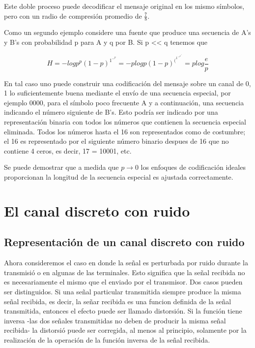 Este doble proceso puede decodificar el mensaje original en los mismo s\'{i}mbolos, pero con un radio de compresi\'{o}n promedio de $\frac{7}{8}$.

Como un segundo ejemplo considere una fuente que produce una secuencia de A's y B's con probabilidad p para A y q por B. Si p << q tenemos que

\begin{equation}
H = - log p^p (1 - p)^1^-^p
= -p log p(1-p)^(^1^-^p^)^/^p
= p log \frac{e}{p}
\end{equation}

En tal caso uno puede construir una codificaci\'{o}n del mensaje sobre un canal de 0, 1 lo suficientemente buena mediante el env\'{i}o de una secuencia especial, por ejemplo 0000, para el s\'{i}mbolo poco frecuente A y a continuaci\'{o}n, una secuencia indicando el n\'{u}mero siguiente de B's. Esto podr\'{i}a ser indicado por una representaci\'{o}n binaria con todos los n\'{u}meros que contienen la secuencia especial eliminada. Todos los n\'{u}meros hasta el 16 son representados como de costumbre; el 16 es representado por el siguiente n\'{u}mero binario despues de 16 que no contiene 4 ceros, es decir, 17  = 10001, etc.

Se puede demostrar que a medida que $p\rightarrow{0}$ los enfoques de codificaci\'{o}n ideales proporcionan la longitud de la secuencia especial es ajustada correctamente.

\part{El canal discreto con ruido}
\label{part:2}

\chapter{Representaci\'{o}n de un canal discreto con ruido}
\label{sec:11}

Ahora consideremos el caso en donde la señal es perturbada por ruido durante la transmisi\'{o} o en algunas de las terminales. Esto significa que la señal recibida no es necesariamente el mismo que el enviado por el transmisor. Dos casos pueden ser distinguidos. Si una señal particular transmitida siempre produce la misma señal recibida, es decir, la señar recibida es una funcion definida de la señal transmitida, entonces el efecto puede ser llamado distorsi\'{o}n. Si la función tiene inversa -las dos señales transmitidas no deben de producir la misma señal recibida- la distorsi\'{o} puede ser corregida, al menos al principio, solamente por la realizaci\'{o}n de la operaci\'{o}n de la funci\'{o}n inversa de la señal recibida.

